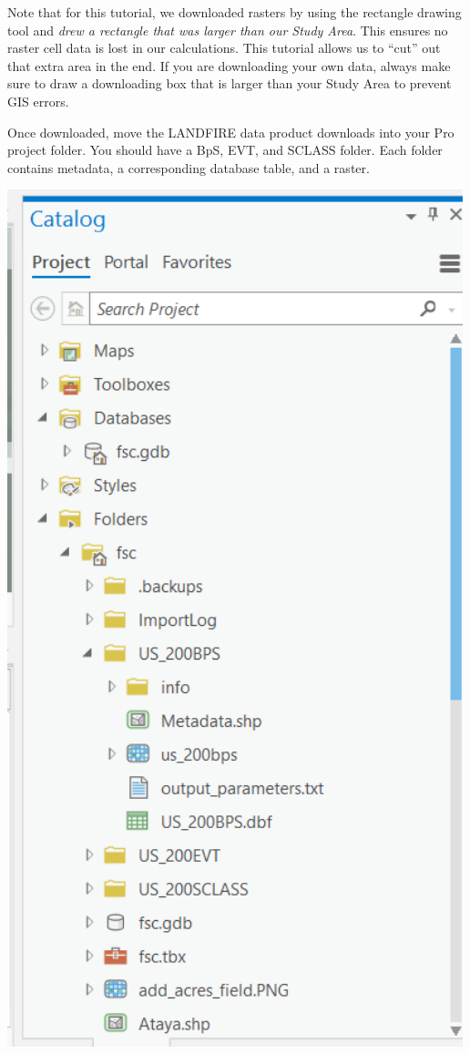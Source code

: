 \documentclass[
]{book}
\begin{document}
Note that for this tutorial, we downloaded rasters by using the rectangle drawing tool and \emph{drew a rectangle that was larger than our Study Area}. This ensures no raster cell data is lost in our calculations. This tutorial allows us to ``cut'' out that extra area in the end. If you are downloading your own data, always make sure to draw a downloading box that is larger than your Study Area to prevent GIS errors.

Once downloaded, move the LANDFIRE data product downloads into your Pro project folder. You should have a BpS, EVT, and SCLASS folder. Each folder contains metadata, a corresponding database table, and a raster.

\includegraphics[width=500px]{04_gis_screenshots/3_fsc_pro_poject_catalog}
\end{document}
